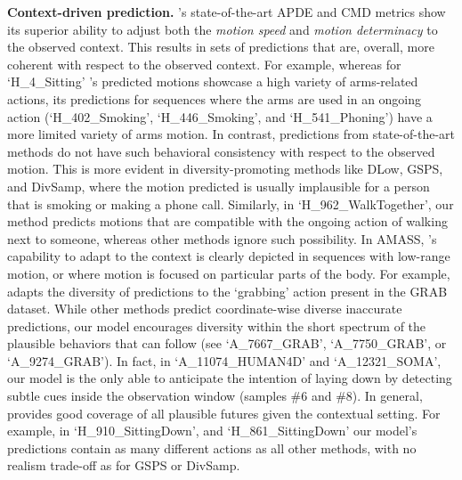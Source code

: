 \documentclass[10pt,twocolumn,letterpaper]{article}
\begin{document}
\textbf{Context-driven prediction. } \modelname{}'s state-of-the-art APDE and CMD metrics show its superior ability to adjust both the \textit{motion speed} and \textit{motion determinacy} to the observed context. This results in sets of predictions that are, overall, more coherent with respect to the observed context. For example, whereas for `H\_4\_Sitting' \modelname{}'s predicted motions showcase a high variety of arms-related actions, its predictions for sequences where the arms are used in an ongoing action (`H\_402\_Smoking', `H\_446\_Smoking', and `H\_541\_Phoning') have a more limited variety of arms motion. In contrast, predictions from state-of-the-art methods do not have such behavioral consistency with respect to the observed motion. This is more evident in diversity-promoting methods like DLow, GSPS, and DivSamp, where the motion predicted is usually implausible for a person that is smoking or making a phone call. Similarly, in `H\_962\_WalkTogether', our method predicts motions that are compatible with the ongoing action of walking next to someone, whereas other methods ignore such possibility. In AMASS, \modelname{}'s capability to adapt to the context is clearly depicted in sequences with low-range motion, or where motion is focused on particular parts of the body. For example, \modelname{} adapts the diversity of predictions to the `grabbing' action present in the GRAB dataset. While other methods predict coordinate-wise diverse inaccurate predictions, our model encourages diversity within the short spectrum of the plausible behaviors that can follow (see `A\_7667\_GRAB', `A\_7750\_GRAB', or `A\_9274\_GRAB'). In fact, in `A\_11074\_HUMAN4D' and `A\_12321\_SOMA', our model is the only able to anticipate the intention of laying down by detecting subtle cues inside the observation window (samples \#6 and \#8).  In general, \modelname{} provides good coverage of all plausible futures given the contextual setting. For example, in `H\_910\_SittingDown', and `H\_861\_SittingDown' our model's predictions contain as many different actions as all other methods, with no realism trade-off as for GSPS or DivSamp.
\end{document}
